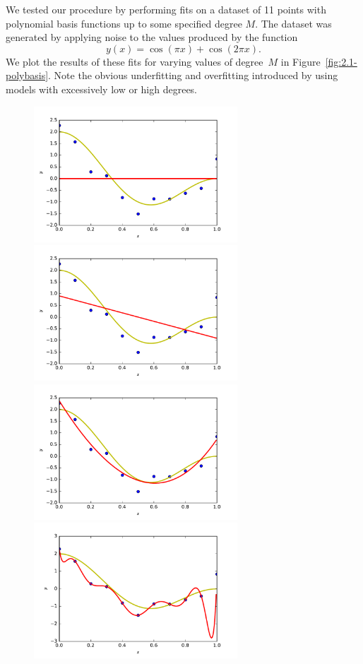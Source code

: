 \documentclass{article}
\begin{document}
\begin{multicols}{2}
We tested our procedure by performing fits on a dataset of 11 points with polynomial basis functions up to some specified degree $M$. The dataset was generated by applying noise to the values produced by the function
\begin{equation}
\label{eq:dataset-secret-func}
y(x) = \cos(\pi x) + \cos(2\pi x).
\end{equation}
We plot the results of these fits for varying values of degree~$M$ in Figure~\ref{fig:2.1-polybasis}. Note the obvious underfitting and overfitting introduced by using models with excessively low or high degrees.
\end{multicols}

\begin{figure} %
   \centering
   \includegraphics[width=3in]{img/2-1_degree0.pdf}  %
   \includegraphics[width=3in]{img/2-1_degree1.pdf}  %
   \includegraphics[width=3in]{img/2-1_degree3.pdf}  %
   \includegraphics[width=3in]{img/2-1_degree10.pdf}  %

\end{figure}
\end{document}

